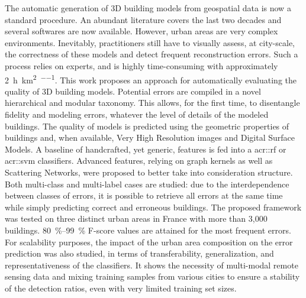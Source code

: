 The automatic generation of 3D building models from geospatial data is now a standard procedure.
An abundant literature covers the last two decades and several softwares are now available.
However, urban areas are very complex environments.
Inevitably, practitioners still have to visually assess, at city-scale, the correctness of these models and detect frequent reconstruction errors.
Such a process relies on experts, and is highly time-consuming with approximately \SI[per-mode=repeated-symbol]{2}{\hour\per\km\squared\per\expert}.
This work proposes an approach for automatically evaluating the quality of 3D building models.
Potential errors are compiled in a novel hierarchical and modular taxonomy.
This allows, for the first time, to disentangle fidelity and modeling errors, whatever the level of details of the modeled buildings.
The quality of models is predicted using the geometric properties of buildings and, when available, Very High Resolution images and Digital Surface Models.
A baseline of handcrafted, yet generic, features is fed into a \acrlong*{acr::rf} or \acrlong*{acr::svm} classifiers.
Advanced features, relying on graph kernels as well as Scattering Networks, were proposed to better take into consideration structure.
Both multi-class and multi-label cases are studied: due to the interdependence between classes of errors, it is possible to retrieve all errors at the same time while simply predicting correct and erroneous buildings.
The proposed framework was tested on three distinct urban areas in France with more than 3,000 buildings.
\SIrange{80}{99}{\percent} F-score values are attained for the most frequent errors.
For scalability purposes, the impact of the urban area composition on the error prediction was also studied, in terms of transferability, generalization, and representativeness of the classifiers.
It shows the necessity of multi-modal remote sensing data and mixing training samples from various cities to ensure a stability of the detection ratios, even with very limited training set sizes.
